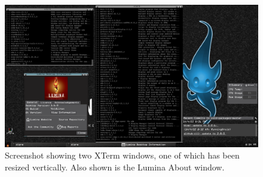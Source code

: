 %

\begin{figure}[!h]
  \centering
   \includegraphics[totalheight=3.1in,width=1.0\textwidth]{xterm.png}
  \caption{Screenshot showing two XTerm windows, one of which has been resized vertically. Also shown is the Lumina About window.}
  \label{fig:xterm}
\end{figure}

%

